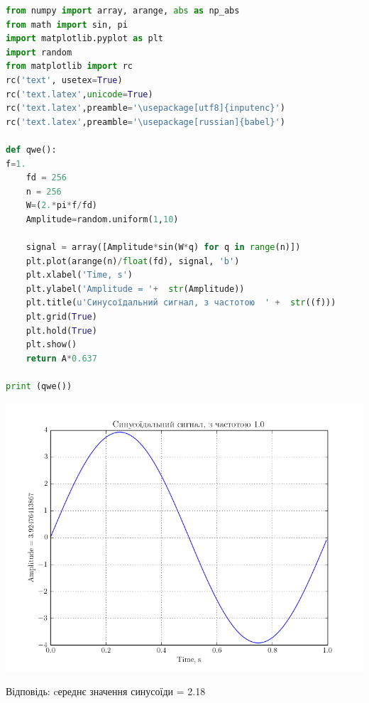 \documentclass[a4paper,12pt]{article}
\begin{document}
\begin{lstlisting}[language=Python]
from numpy import array, arange, abs as np_abs
from math import sin, pi
import matplotlib.pyplot as plt
import random
from matplotlib import rc
rc('text', usetex=True)
rc('text.latex',unicode=True)
rc('text.latex',preamble='\usepackage[utf8]{inputenc}')
rc('text.latex',preamble='\usepackage[russian]{babel}')

def qwe():
f=1.
	fd = 256
	n = 256
	W=(2.*pi*f/fd)
	Amplitude=random.uniform(1,10)

	signal = array([Amplitude*sin(W*q) for q in range(n)])
	plt.plot(arange(n)/float(fd), signal, 'b')
	plt.xlabel('Time, s')
	plt.ylabel('Amplitude = '+  str(Amplitude))
	plt.title(u'Синусоїдальний сигнал, з частотою  ' +  str((f)))
	plt.grid(True)
	plt.hold(True)
	plt.show()
	return A*0.637

print (qwe())
\end{lstlisting}
\begin{center}
\includegraphics[height = 12 cm, width=18 cm]{8.png}\par
\vspace{1cm}
\end{center}
Відповідь: cереднє значення синусоїди = 2.18
\end{document}

